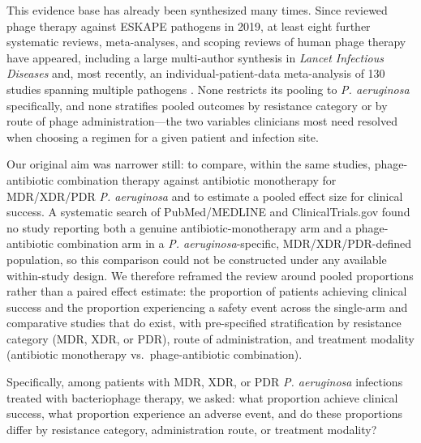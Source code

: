 This evidence base has already been synthesized many times. Since \textcite{ElHaddad2019_eskape} reviewed phage therapy against ESKAPE pathogens in 2019, at least eight further systematic reviews, meta-analyses, and scoping reviews of human phage therapy have appeared, including a large multi-author synthesis in \textit{Lancet Infectious Diseases} \parencite{Uyttebroek2022_lancetid} and, most recently, an individual-patient-data meta-analysis of 130 studies spanning multiple pathogens \parencite{Liu2025_ijaa}. None restricts its pooling to \textit{P. aeruginosa} specifically, and none stratifies pooled outcomes by resistance category or by route of phage administration---the two variables clinicians most need resolved when choosing a regimen for a given patient and infection site.

Our original aim was narrower still: to compare, within the same studies, phage-antibiotic combination therapy against antibiotic monotherapy for MDR/XDR/PDR \textit{P. aeruginosa} and to estimate a pooled effect size for clinical success. A systematic search of PubMed/MEDLINE and ClinicalTrials.gov found no study reporting both a genuine antibiotic-monotherapy arm and a phage-antibiotic combination arm in a \textit{P. aeruginosa}-specific, MDR/XDR/PDR-defined population, so this comparison could not be constructed under any available within-study design. We therefore reframed the review around pooled proportions rather than a paired effect estimate: the proportion of patients achieving clinical success and the proportion experiencing a safety event across the single-arm and comparative studies that do exist, with pre-specified stratification by resistance category (MDR, XDR, or PDR), route of administration, and treatment modality (antibiotic monotherapy vs.\ phage-antibiotic combination).

Specifically, among patients with MDR, XDR, or PDR \textit{P. aeruginosa} infections treated with bacteriophage therapy, we asked: what proportion achieve clinical success, what proportion experience an adverse event, and do these proportions differ by resistance category, administration route, or treatment modality?

